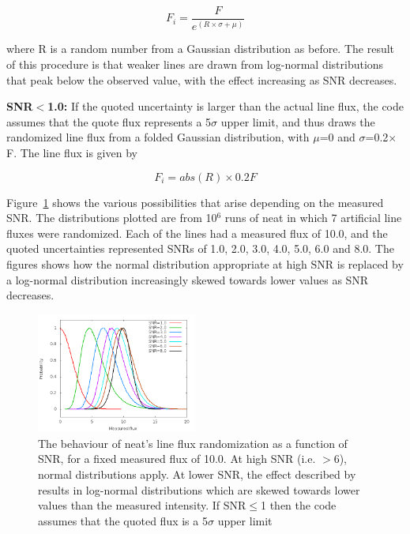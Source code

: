 \documentclass[useAMS,usenatbib]{mn2e}
\begin{document}
\begin{equation}
F_i = \frac{F}{e^{(R\times\sigma + \mu)}}
\end{equation}

where R is a random number from a Gaussian distribution as before.  The result of this procedure is that weaker lines are drawn from log-normal distributions that peak below the observed value, with the effect increasing as SNR decreases.

{\bf SNR$<$1.0: } If the quoted uncertainty is larger than the actual line flux, the code assumes that the quote flux represents a 5$\sigma$ upper limit, and thus draws the randomized line flux from a folded Gaussian distribution, with $\mu$=0 and $\sigma$=0.2$\times$F.  The line flux is given by

\begin{equation}
F_i = abs(R)\times0.2F
\end{equation}

Figure~\ref{distributions} shows the various possibilities that arise depending on the measured SNR.  The distributions plotted are from 10$^6$ runs of {\sc neat} in which 7 artificial line fluxes were randomized.  Each of the lines had a measured flux of 10.0, and the quoted uncertainties represented SNRs of 1.0, 2.0, 3.0, 4.0, 5.0, 6.0 and 8.0.  The figures shows how the normal distribution appropriate at high SNR is replaced by a log-normal distribution increasingly skewed towards lower values as SNR decreases.

\begin{figure}
\includegraphics[width=0.47\textwidth]{figures/distributions_2.png}
\caption{The behaviour of {\sc neat}'s line flux randomization as a function of SNR, for a fixed measured flux of 10.0.  At high SNR (i.e. $>$6), normal distributions apply.  At lower SNR, the effect described by \citet{1994A&A...287..676R} results in log-normal distributions which are skewed towards lower values than the measured intensity.  If SNR$\leq$1 then the code assumes that the quoted flux is a 5$\sigma$ upper limit}
\label{distributions}
\end{figure}
\end{document}
